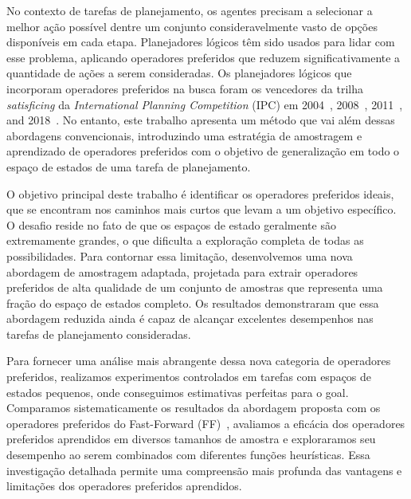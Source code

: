 \documentclass[ppgc,diss,english]{iiufrgs}
\begin{document}
No contexto de tarefas de planejamento, os agentes precisam a selecionar a melhor ação possível dentre um conjunto consideravelmente vasto de opções disponíveis em cada etapa. Planejadores lógicos têm sido usados para lidar com esse problema, aplicando operadores preferidos que reduzem significativamente a quantidade de ações a serem consideradas. Os planejadores lógicos que incorporam operadores preferidos na busca foram os vencedores da trilha \emph{satisficing} da \emph{International Planning Competition} (IPC) em 2004~\cite{Helmert/2006}, 2008~\cite{Richter.lama.etal/2010}, 2011~\cite{Richter.lama.etal/2011}, and 2018~\cite{Seipp-fast.etal/2018}.
No entanto, este trabalho apresenta um método que vai além dessas abordagens convencionais, introduzindo uma estratégia de amostragem e aprendizado de operadores preferidos com o objetivo de generalização em todo o espaço de estados de uma tarefa de planejamento.

O objetivo principal deste trabalho é identificar os operadores preferidos ideais, que se encontram nos caminhos mais curtos que levam a um objetivo específico. O desafio reside no fato de que os espaços de estado geralmente são extremamente grandes, o que dificulta a exploração completa de todas as possibilidades. Para contornar essa limitação, desenvolvemos uma nova abordagem de amostragem adaptada, projetada para extrair operadores preferidos de alta qualidade de um conjunto de amostras que representa uma fração do espaço de estados completo. Os resultados demonstraram que essa abordagem reduzida ainda é capaz de alcançar excelentes desempenhos nas tarefas de planejamento consideradas.

Para fornecer uma análise mais abrangente dessa nova categoria de operadores preferidos, realizamos experimentos controlados em tarefas com espaços de estados pequenos, onde conseguimos estimativas perfeitas para o goal. Comparamos sistematicamente os resultados da abordagem proposta com os operadores preferidos do Fast-Forward (FF)~\cite{Hoffmann.Nebel/2001, Helmert/2006}, avaliamos a eficácia dos operadores preferidos aprendidos em diversos tamanhos de amostra e exploraramos seu desempenho ao serem combinados com diferentes funções heurísticas. Essa investigação detalhada permite uma compreensão mais profunda das vantagens e limitações dos operadores preferidos aprendidos.
\end{document}
